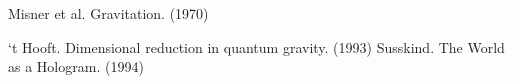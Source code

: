 \documentclass[12pt]{article}
\begin{document}
\begin{thebibliography}{9}

 Misner et al. Gravitation. (1970)

 `t Hooft. Dimensional reduction in quantum gravity. (1993)
 Susskind. The World as a Hologram. (1994)




\end{thebibliography}
\end{document}
